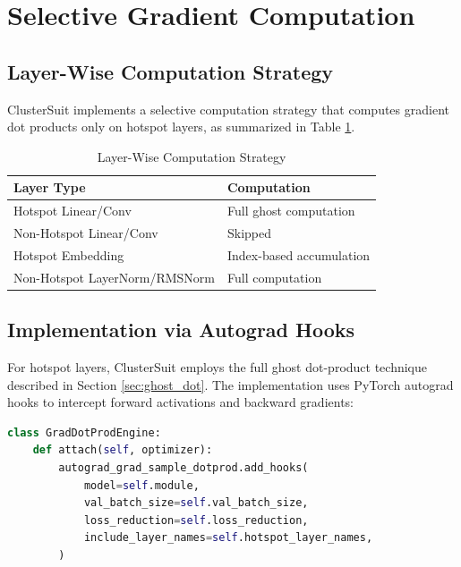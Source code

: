 \documentclass[12pt,a4paper]{report}
\begin{document}
\section{Selective Gradient Computation}
\label{sec:selective_gradient}

\subsection{Layer-Wise Computation Strategy}
\label{sec:layer_strategy}

ClusterSuit implements a selective computation strategy that computes gradient dot products only on hotspot layers, as summarized in Table \ref{tab:layer_computation}.

\begin{table}[htbp]
    \centering
    \caption{Layer-Wise Computation Strategy}
    \begin{tabular}{ll}
        \toprule
        \textbf{Layer Type} & \textbf{Computation} \\
        \midrule
        Hotspot Linear/Conv & Full ghost computation \\
        Non-Hotspot Linear/Conv & Skipped \\
        Hotspot Embedding & Index-based accumulation \\
        Non-Hotspot LayerNorm/RMSNorm & Full computation \\
        \bottomrule
    \end{tabular}
    \label{tab:layer_computation}
\end{table}

\subsection{Implementation via Autograd Hooks}
\label{sec:autograd_hooks}

For hotspot layers, ClusterSuit employs the full ghost dot-product technique described in Section \ref{sec:ghost_dot}. The implementation uses PyTorch autograd hooks to intercept forward activations and backward gradients:

\begin{lstlisting}[language=Python]
class GradDotProdEngine:
    def attach(self, optimizer):
        autograd_grad_sample_dotprod.add_hooks(
            model=self.module,
            val_batch_size=self.val_batch_size,
            loss_reduction=self.loss_reduction,
            include_layer_names=self.hotspot_layer_names,
        )
\end{lstlisting}
\end{document}
